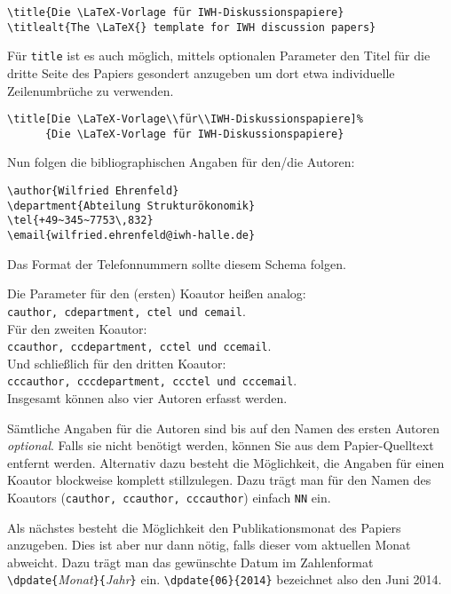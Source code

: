 \documentclass[german]{iwhdp}
\begin{document}
\verb|\title{Die \LaTeX-Vorlage für IWH-Diskussionspapiere}|\\
\verb|\titlealt{The \LaTeX{} template for IWH discussion papers}|


Für \texttt{title} ist es auch möglich, mittels optionalen Parameter den Titel für die dritte Seite des Papiers gesondert anzugeben um dort etwa individuelle Zeilenumbrüche zu verwenden.

\verb|\title[Die \LaTeX-Vorlage\\für\\IWH-Diskussionspapiere]%|\\
\verb|      {Die \LaTeX-Vorlage für IWH-Diskussionspapiere}|


Nun folgen die bibliographischen Angaben für den/die Autoren:

\verb|\author{Wilfried Ehrenfeld}|\\
\verb|\department{Abteilung Strukturökonomik}|\\
\verb|\tel{+49~345~7753\,832}|\\
\verb|\email{wilfried.ehrenfeld@iwh-halle.de}|

Das Format der Telefonnummern sollte diesem Schema folgen.


Die Parameter für den (ersten) Koautor heißen analog:\\%
\texttt{cauthor, cdepartment, ctel und cemail}.\\
Für den zweiten Koautor:\\%
\texttt{ccauthor, ccdepartment, cctel und ccemail}.\\
Und schließlich für den dritten Koautor:\\%
\texttt{cccauthor, cccdepartment, ccctel und cccemail}.\\
Insgesamt können also vier Autoren erfasst werden.


Sämtliche Angaben für die Autoren sind bis auf den Namen des ersten Autoren \emph{optional}.
Falls sie nicht benötigt werden, können Sie aus dem Papier-Quelltext entfernt werden.
Alternativ dazu besteht die Möglichkeit, die Angaben für einen Koautor blockweise komplett stillzulegen.
Dazu trägt man für den Namen des Koautors (\texttt{cauthor, ccauthor, cccauthor}) einfach \texttt{NN} ein.


Als nächstes besteht die Möglichkeit den Publikationsmonat des Papiers anzugeben.
Dies ist aber nur dann nötig, falls dieser vom aktuellen Monat abweicht.
Dazu trägt man das gewünschte Datum im Zahlenformat 
\verb|\dpdate{|\emph{Monat}\verb|}{|\emph{Jahr}\verb|}| ein.
\verb|\dpdate{06}{2014}| bezeichnet also den Juni 2014.
\end{document}
